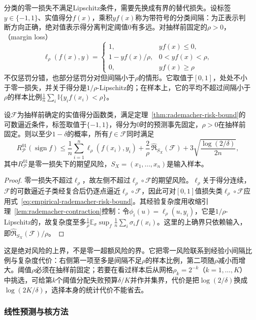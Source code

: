 分类的零一损失不满足Lipschitz条件，需要先换成有界的替代损失。设标签$y\in\{-1,1\}$、实值得分$f(x)$，乘积$yf(x)$称为带符号的分类间隔：为正表示判断方向正确，绝对值表示得分离判定阈值0有多远。对抽样前固定的$\rho>0$，（margin loss）
\[
 \ell_\rho(f(x),y)=
 \begin{cases}
  1,&yf(x)\leq0,\\
  1-yf(x)/\rho,&0<yf(x)<\rho,\\
  0,&yf(x)\geq\rho
 \end{cases}
\]
不仅惩罚分错，也部分惩罚分对但间隔小于$\rho$的情形。它取值于$[0,1]$，处处不小于零一损失，并关于得分是$1/\rho$-Lipschitz的；在样本上，它的平均不超过间隔小于$\rho$的样本比例$\frac1n\sum_i\mathbb I\{y_if(x_i)<\rho\}$。

\begin{theorem}[间隔损失的分类风险界]
\label{thm:margin-risk-bound}
设$\mathcal F$为抽样前确定的实值得分函数类，满足定理~\ref{thm:rademacher-risk-bound}的可数逼近条件，标签取值于$\{-1,1\}$，得分为0时的预测事先固定，$\rho>0$在抽样前固定。则以至少$1-\delta$的概率，所有$f\in\mathcal F$同时满足
\[
 R^{01}_{\mathcal P}(\operatorname{sign}f)
 \leq\frac1n\sum_{i=1}^n\ell_\rho(f(x_i),y_i)
 +\frac2\rho\,\widehat{\mathfrak R}_{S_X}(\mathcal F)
 +3\sqrt{\frac{\log(2/\delta)}{2n}},
\]
其中$R^{01}_{\mathcal P}$是零一损失下的期望风险，$S_X=(x_1,\ldots,x_n)$是输入样本。
\end{theorem}
\begin{proof}
零一损失不超过$\ell_\rho$，故左侧不超过$\ell_\rho\circ\mathcal F$的期望风险。$\ell_\rho$关于得分连续，$\mathcal F$的可数逼近子类经复合后仍逐点逼近$\ell_\rho\circ\mathcal F$，因此可对$[0,1]$值损失类$\ell_\rho\circ\mathcal F$应用式~\eqref{eq:empirical-rademacher-risk-bound}。其经验复杂度用收缩引理~\ref{lem:rademacher-contraction}控制：令$\phi_i(u)=\ell_\rho(u,y_i)$，它是$1/\rho$-Lipschitz的，故复杂度至多$\frac1\rho\mathbb E_\sigma\sup_f\frac1n\sum_i\sigma_if(x_i)$。这里的上确界只依赖输入，即$\widehat{\mathfrak R}_{S_X}(\mathcal F)/\rho$。
\end{proof}

这是绝对风险的上界，不是零一超额风险的界。它把零一风险联系到经验小间隔比例与复杂度代价：右侧第一项至多是间隔不足$\rho$的样本比例，第二项随$\rho$减小而增大。阈值$\rho$必须在抽样前固定；若要在看过样本后从网格$\rho_k=2^{-k}$（$k=1,\ldots,K$）中挑选，可给第$k$个阈值分配失败预算$\delta/K$并作并集界，代价是把$\log(2/\delta)$换成$\log(2K/\delta)$，选择本身的统计代价不能省去。
\subsubsection{线性预测与核方法}
\label{sec:linear-kernel-complexity}

